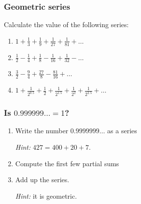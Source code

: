 \documentclass[14pt]{beamer}
\begin{document}
	\begin{frame}[t]
		\fontsize{13}{13}\selectfont
		\frametitle{Geometric series}

		Calculate the value of the following series:

		\begin{enumerate}
			\item $\displaystyle 1 + \frac{1}{3}+ \frac{1}{9}+ \frac{1}{27}+ \frac{1}{81}
				+ \ldots$
				\vspace{.5cm}

			\item $\displaystyle \frac{1}{2}- \frac{1}{4}+ \frac{1}{8}- \frac{1}{16}+ \frac{1}{32}
				- \ldots$
				\vspace{.5cm}

			\item $\displaystyle \frac{3}{2}- \frac{9}{4}+ \frac{27}{8}- \frac{81}{16}+
				\ldots$
				\vspace{.5cm}

			\item $\displaystyle 1 + \frac{1}{2^{0.5}}+ \frac{1}{2}+ \frac{1}{2^{1.5}}+
				\frac{1}{2^{2}}+ \frac{1}{2^{2.5}}+ \ldots$
				\vspace{.5cm}
		\end{enumerate}
	\end{frame}

	\begin{frame}[t]
		\frametitle{Is $\displaystyle 0.999999\ldots = 1$?}

		\begin{enumerate}
			\item Write the number \; $\displaystyle 0.9999999\ldots$ \; as a series

				\emph{Hint:} $\displaystyle 427 = 400 + 20 + 7$.
				\vspace{.5cm}

			\item Compute the first few partial sums
				\vspace{.5cm}

			\item Add up the series.

				\emph{Hint:} it is geometric.
		\end{enumerate}
	\end{frame}
\end{document}
